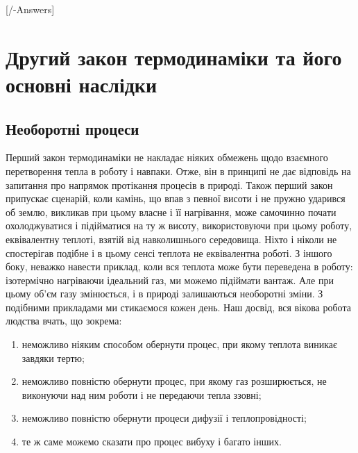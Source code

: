
\setcounter{chapter}{2}

[\currfilebase/\currfilebase-Answers]
\chapter{Другий закон термодинаміки та його основні наслідки}\label{\currfilebase}
\graphicspath{{\currfilebase/pictures}}
\makeatletter
{}
\makeatother

\section{Необоротні процеси}
Перший закон термодинаміки не накладає ніяких обмежень щодо взаємного перетворення тепла в роботу і
навпаки. Отже, він в принципі не дає відповідь на запитання про напрямок протікання процесів в
природі. Також перший закон припускає сценарій, коли камінь, що впав з певної висоти і не пружно
ударився об землю, викликав при цьому власне і її нагрівання, може самочинно почати охолоджуватися і
підійматися на ту ж висоту, використовуючи при цьому роботу, еквівалентну теплоті, взятій від
навколишнього середовища. Ніхто і ніколи не спостерігав подібне і в цьому сенсі теплота не
еквівалентна роботі. З іншого боку, неважко навести приклад, коли вся теплота може бути переведена в
роботу: ізотермічно нагріваючи ідеальний газ, ми можемо підіймати вантаж. Але при цьому об'єм газу
змінюється, і в природі залишаються необоротні зміни. З подібними прикладами ми стикаємося кожен день.
Наш досвід, вся вікова робота людства вчать, що зокрема:
\begin{enumerate}
	\item [а)] неможливо ніяким способом обернути процес, при якому теплота виникає завдяки тертю;
	\item [б)] неможливо повністю обернути процес, при якому газ розширюється, не виконуючи над ним роботи і не передаючи тепла ззовні;
	\item [в)] неможливо повністю обернути процеси дифузії і теплопровідності;
	\item [г)] те ж саме можемо сказати про процес вибуху і  багато інших.
\end{enumerate}


